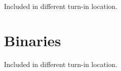 \documentclass{article}
\begin{document}
\begin{enumerate}
Included in different turn-in location.

\section{Binaries}

Included in different turn-in location.


\begin{appendices}
%
%
%


\end{appendices}




\end{enumerate}
\end{document}
